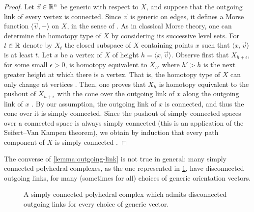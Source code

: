 \begin{proof}
    Let $\vec v \in \mathbb R^n$ be generic with respect to $X$, and suppose that the outgoing link of every vertex is connected. 
    Since $\vec v$ is generic on edges, it defines a Morse function $\langle \vec v , -\rangle$ on $X$, in the sense of \cite[Definition 2.2]{bestvinaMorseTheoryFiniteness1997}.
    As in classical Morse theory, one can determine the homotopy type of $X$ by considering its successive level sets. 
    For $t \in \mathbb R$ denote by $X_t$ the closed subspace of $X$ containing points $x$ such that $\langle x, \vec v \rangle$ is at least $t$.
    Let $x$ be a vertex of $X$ of height $h=\langle x, \vec v \rangle$.
    Observe first that $X_{h+\epsilon}$, for some small $\epsilon>0$, is homotopy equivalent to $X_{h'}$ where $h' > h$ is the next greater height at which there is a vertex.
    That is, the homotopy type of $X$ can only change at vertices  \cite[Lemma 2.3]{bestvinaMorseTheoryFiniteness1997}.
    Then, one proves that $X_h$ is homotopy equivalent to the pushout of $X_{h+\epsilon}$ with the cone over the outgoing link of $x$ along the outgoing link of $x$  \cite[Lemma 2.5]{bestvinaMorseTheoryFiniteness1997}.
    By our assumption, the outgoing link of $x$ is connected, and thus the cone over it is simply connected. 
    Since the pushout of simply connected spaces over a connected space is always simply connected (this is an application of the Seifert--Van Kampen theorem), we obtain by induction that every path component of $X$ is simply connected \cite[Point (3) of Corollary 2.6]{bestvinaMorseTheoryFiniteness1997}.
\end{proof}

The converse of \cref{lemma:outgoing-link} is not true in general: many simply connected polyhedral complexes, as the one represented in \cref{fig:outgoingpoly}, have disconnected outgoing links, for many (sometimes for all) choices of generic orientation vectors. 

\begin{figure}[h!]
\centering
{}
\caption{A simply connected polyhedral complex which admits disconnected outgoing links for every choice of generic vector.}
\label{fig:outgoingpoly}
\end{figure}

